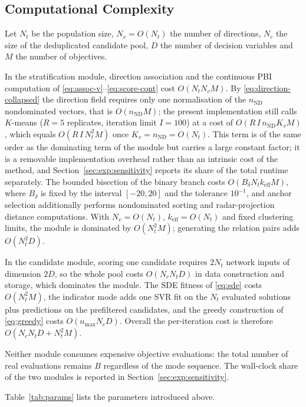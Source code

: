 \documentclass[11pt,a4paper]{article}
\newcommand{\keff}{k_{\mathrm{eff}}}
\begin{document}
\subsection{Computational Complexity}
\label{sec:method:complexity}

Let $N_t$ be the population size, $N_v=O(N_t)$ the number of directions, $N_c$
the size of the deduplicated candidate pool, $D$ the number of decision
variables and $M$ the number of objectives.

In the stratification module, direction association and the continuous PBI
computation of \eqref{eq:assoc-v}--\eqref{eq:score-cont} cost $O(N_tN_vM)$. By
\eqref{eq:direction-collapsed} the direction field requires only one normalisation
of the $n_{\mathrm{ND}}$ nondominated vectors, that is $O(n_{\mathrm{ND}}M)$; the
present implementation still calls $K$-means ($R=5$ replicates, iteration limit
$I=100$) at a cost of $O(R\,I\,n_{\mathrm{ND}}K_vM)$, which equals
$O(R\,I\,N_t^2M)$ once $K_v=n_{\mathrm{ND}}=O(N_t)$. This term is of the same order
as the dominating term of the module but carries a large constant factor; it is a
removable implementation overhead rather than an intrinsic cost of the method, and
Section~\ref{sec:exp:sensitivity} reports its share of the total runtime
separately. The
bounded bisection of the binary branch costs
$O(B_\delta N_t\keff M)$, where $B_\delta$ is fixed by the interval $[-20,20]$
and the tolerance $10^{-1}$, and anchor selection additionally performs
nondominated sorting and radar-projection distance computations. With
$N_v=O(N_t)$, $\keff=O(N_t)$ and fixed clustering limits, the module is dominated
by $O(N_t^2M)$; generating the relation pairs adds $O(N_t^2D)$.

In the candidate module, scoring one candidate requires $2N_t$ network inputs of
dimension $2D$, so the whole pool costs $O(N_cN_tD)$ in data construction and
storage, which dominates the module. The SDE fitness of \eqref{eq:sde} costs
$O(N_t^2M)$, the indicator mode adds one SVR fit on the $N_t$ evaluated solutions
plus predictions on the prefiltered candidates, and the greedy construction of
\eqref{eq:greedy} costs $O(n_{\max}N_cD)$. Overall the per-iteration cost is
therefore $O(N_cN_tD+N_t^2M)$.

Neither module consumes expensive objective evaluations: the total number of real
evaluations remains $B$ regardless of the mode sequence. The wall-clock share of
the two modules is reported in Section~\ref{sec:exp:sensitivity}.

Table~\ref{tab:params} lists the parameters introduced above.
\end{document}

